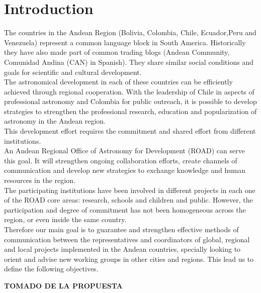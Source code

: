 \newpage
\section{Introduction}

The countries in the Andean Region (Bolivia, Colombia, Chile, Ecuador,Peru and Venezuela) represent a common language block in South America. 
Historically they have also made part of common trading blogs (Andean Community, Comunidad Andina (CAN) in Spanish).
They share similar social conditions and goals for scientific and cultural development.
\\

The astronomical development in each of these countries can be efficiently achieved through regional cooperation. With the leadership of Chile in aspects of professional astronomy and Colombia for public outreach, it is possible to develop strategies to strengthen the professional research, education and popularization of astronomy in the Andean region.
\\

This development effort requires the commitment and shared effort from different institutions.
\\

An Andean Regional Office of Astronomy for Development (ROAD) can serve this goal. It will strengthen ongoing collaboration efforts, create channels of communication and develop new strategies to exchange knowledge and human resources in the region. 
\\

The participating institutions have been involved in different projects in each one of the ROAD core areas: research, schools and children and public. However, the participation and degree of commitment has not been homogeneous across the region, or even inside the same country.
\\

Therefore our main goal is to guarantee and strengthen effective methods of communication between the representatives and coordinators of global, regional and local projects implemented in the Andean countries, specially looking to orient and advise new working groups
in other cities and regions. This lead us to define the following objectives.
 
\newline
\textbf{TOMADO DE LA PROPUESTA}